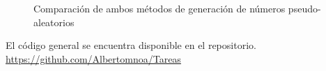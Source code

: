 \documentclass{article}
\begin{document}
\begin{figure}

\centering
{}
\vspace{-0.3cm}
\centering
{}
\caption{Comparación de ambos métodos de generación de números pseudo-aleatorios}
\label{fig:2} 
\end{figure}

El código general se encuentra disponible en el repositorio. \href{https://github.com/Albertomnoa/Tareas_MPA/tree/master/Tarea4}{https://github.com/Albertomnoa/Tareas} 

\newpage


\end{document}
